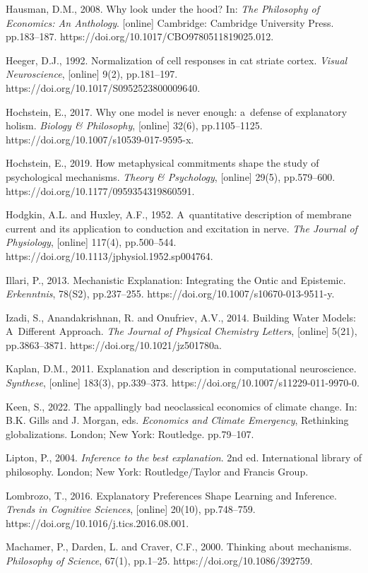 Hausman, D.M., 2008. Why look under the hood? In: \textit{The Philosophy of Economics: An Anthology}. [online] Cambridge: Cambridge University Press. pp.183–187. https://doi.org/10.1017/CBO9780511819025.012.

Heeger, D.J., 1992. Normalization of cell responses in cat striate cortex. \textit{Visual Neuroscience}, [online] 9(2), pp.181–197. https://doi.org/10.1017/S0952523800009640.

Hochstein, E., 2017. Why one model is never enough: a~defense of explanatory holism. \textit{Biology \& Philosophy}, [online] 32(6), pp.1105–1125. https://doi.org/10.1007/s10539-017-9595-x.

Hochstein, E., 2019. How metaphysical commitments shape the study of psychological mechanisms. \textit{Theory \& Psychology}, [online] 29(5), pp.579–600. https://doi.org/10.1177/0959354319860591.

Hodgkin, A.L. and Huxley, A.F., 1952. A~quantitative description of membrane current and its application to conduction and excitation in nerve. \textit{The Journal of Physiology}, [online] 117(4), pp.500–544. https://doi.org/10.1113/jphysiol.1952.sp004764.

Illari, P., 2013. Mechanistic Explanation: Integrating the Ontic and Epistemic. \textit{Erkenntnis}, 78(S2), pp.237–255. https://doi.org/10.1007/s10670-013-9511-y.

Izadi, S., Anandakrishnan, R. and Onufriev, A.V., 2014. Building Water Models: A~Different Approach. \textit{The Journal of Physical Chemistry Letters}, [online] 5(21), pp.3863–3871. https://doi.org/10.1021/jz501780a.

Kaplan, D.M., 2011. Explanation and description in computational neuroscience. \textit{Synthese}, [online] 183(3), pp.339–373. https://doi.org/10.1007/s11229-011-9970-0.

Keen, S., 2022. The appallingly bad neoclassical economics of climate change. In: B.K. Gills and J. Morgan, eds. \textit{Economics and Climate Emergency}, Rethinking globalizations. London; New York: Routledge. pp.79–107.

Lipton, P., 2004. \textit{Inference to the best explanation}. 2nd ed. International library of philosophy. London; New York: Routledge/Taylor and Francis Group.

Lombrozo, T., 2016. Explanatory Preferences Shape Learning and Inference. \textit{Trends in Cognitive Sciences}, [online] 20(10), pp.748–759. https://doi.org/10.1016/j.tics.2016.08.001.

Machamer, P., Darden, L. and Craver, C.F., 2000. Thinking about mechanisms. \textit{Philosophy of Science}, 67(1), pp.1–25. https://doi.org/10.1086/392759.

